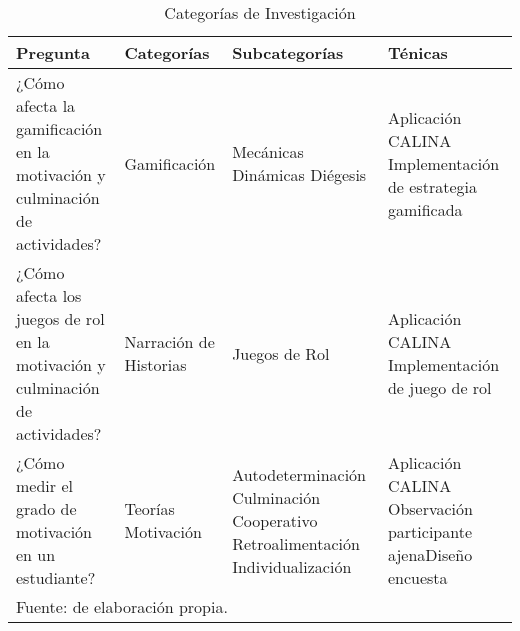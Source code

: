 \begin{table}[ht]
\caption{Categorías de Investigación}
\label{tab:catinv}
\small
\begin{center}
	\begin{tabular}{ p{40mm} p{30mm} p{30mm} p{40mm}}
\toprule
\textbf{Pregunta} & \textbf{Categorías} & \textbf{Subcategorías} & \textbf{Ténicas} \\ 
\midrule
¿Cómo afecta la gamificación en la motivación y culminación de actividades? & Gamificación & Mecánicas 
	\newline Dinámicas \newline Diégesis & Aplicación CALINA \newline Implementación de estrategia 
	gamificada\\
¿Cómo afecta los juegos de rol en la motivación y culminación de actividades? & Narración de Historias & 
	Juegos de Rol & Aplicación CALINA \newline Implementación de juego de rol\\
¿Cómo medir el grado de motivación en un estudiante? & Teorías Motivación & Autodeterminación \newline 
	Culminación \newline Cooperativo \newline Retroalimentación \newline Individualización & Aplicación 
	CALINA \newline Observación participante ajena\newline Diseño encuesta\\
\bottomrule
\multicolumn{4}{l}{\footnotesize Fuente: de elaboración propia.}\\
\end{tabular}
\end{center}
\end{table}

